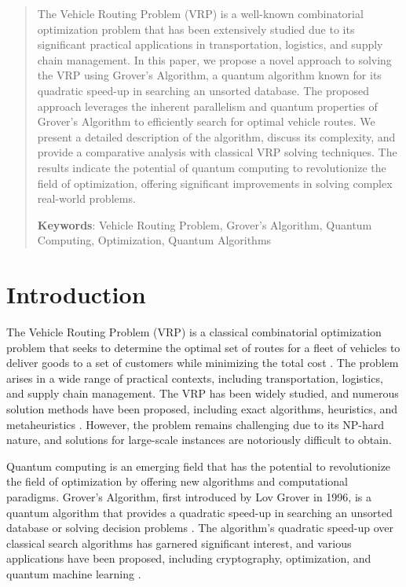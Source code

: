 \begin{abstract}
The Vehicle Routing Problem (VRP) is a well-known combinatorial optimization problem that has been extensively studied due to its significant practical applications in transportation, logistics, and supply chain management. In this paper, we propose a novel approach to solving the VRP using Grover's Algorithm, a quantum algorithm known for its quadratic speed-up in searching an unsorted database. The proposed approach leverages the inherent parallelism and quantum properties of Grover's Algorithm to efficiently search for optimal vehicle routes. We present a detailed description of the algorithm, discuss its complexity, and provide a comparative analysis with classical VRP solving techniques. The results indicate the potential of quantum computing to revolutionize the field of optimization, offering significant improvements in solving complex real-world problems.

\textbf{Keywords}: Vehicle Routing Problem, Grover's Algorithm, Quantum Computing, Optimization, Quantum Algorithms
\end{abstract}

\section{Introduction}

The Vehicle Routing Problem (VRP) is a classical combinatorial optimization problem that seeks to determine the optimal set of routes for a fleet of vehicles to deliver goods to a set of customers while minimizing the total cost \cite{dantzig1959truck}. The problem arises in a wide range of practical contexts, including transportation, logistics, and supply chain management. The VRP has been widely studied, and numerous solution methods have been proposed, including exact algorithms, heuristics, and metaheuristics \cite{laporte2007emergence}. However, the problem remains challenging due to its NP-hard nature, and solutions for large-scale instances are notoriously difficult to obtain.

Quantum computing is an emerging field that has the potential to revolutionize the field of optimization by offering new algorithms and computational paradigms. Grover's Algorithm, first introduced by Lov Grover in 1996, is a quantum algorithm that provides a quadratic speed-up in searching an unsorted database or solving decision problems \cite{grover1996fast}. The algorithm's quadratic speed-up over classical search algorithms has garnered significant interest, and various applications have been proposed, including cryptography, optimization, and quantum machine learning \cite{nielsen2000quantum}.

